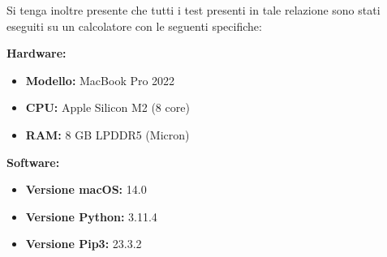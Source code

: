 \documentclass{article}
\begin{document}
\vspace{20pt}


Si tenga inoltre presente che tutti i test presenti in tale relazione sono stati eseguiti su un calcolatore con le seguenti specifiche:

\begin{multicols}{2}
    \textbf{Hardware:}
    \begin{itemize}
        \item \textbf{Modello:} MacBook Pro 2022
        \item \textbf{CPU:} Apple Silicon M2 (8 core)
        \item \textbf{RAM:} 8 GB LPDDR5 (Micron)
    \end{itemize}
    
    \columnbreak
    
    \textbf{Software:}
    \begin{itemize}
        \item \textbf{Versione macOS:} 14.0
        \item \textbf{Versione Python:} 3.11.4
        \item \textbf{Versione Pip3:} 23.3.2
    \end{itemize}
\end{multicols}

\vspace{20pt}

\printbibliography[heading=bibintoc, title={Bibliografia}]  
\end{document}
